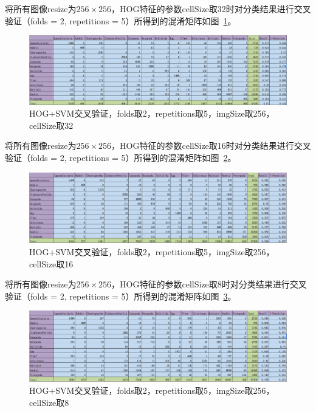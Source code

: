 \documentclass[12pt]{article}
\begin{document}
\begin{enumerate}
将所有图像resize为$256 \times 256$，HOG特征的参数cellSize取32时对分类结果进行交叉验证（folds = 2, repetitions = 5）所得到的混淆矩阵如图~\ref{fig: HOG-SVM-2-folds-5-repetitions-32-256}。
\begin{figure}[!ht]
\centering
\includegraphics[width=1.0\linewidth]{HOG-SVM-2-folds-5-repetitions-32-256}
\caption{HOG+SVM交叉验证，folds取2，repetitions取5，imgSize取256，cellSize取32}
\label{fig: HOG-SVM-2-folds-5-repetitions-32-256}
\end{figure}

将所有图像resize为$256 \times 256$，HOG特征的参数cellSize取16时对分类结果进行交叉验证（folds = 2, repetitions = 5）所得到的混淆矩阵如图~\ref{fig: HOG-SVM-2-folds-5-repetitions-16-256}。
\begin{figure}[!ht]
\centering
\includegraphics[width=1.0\linewidth]{HOG-SVM-2-folds-5-repetitions-16-256}
\caption{HOG+SVM交叉验证，folds取2，repetitions取5，imgSize取256，cellSize取16}
\label{fig: HOG-SVM-2-folds-5-repetitions-16-256}
\end{figure}

将所有图像resize为$256 \times 256$，HOG特征的参数cellSize取8时对分类结果进行交叉验证（folds = 2, repetitions = 5）所得到的混淆矩阵如图~\ref{fig: HOG-SVM-2-folds-5-repetitions-8-256}。
\begin{figure}[!ht]
\centering
\includegraphics[width=1.0\linewidth]{HOG-SVM-2-folds-5-repetitions-8-256}
\caption{HOG+SVM交叉验证，folds取2，repetitions取5，imgSize取256，cellSize取8}
\label{fig: HOG-SVM-2-folds-5-repetitions-8-256}
\end{figure}


\end{enumerate}
\end{document}
